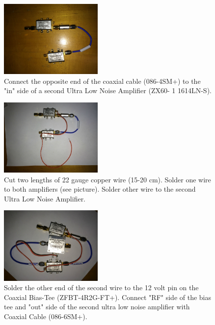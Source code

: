 \documentclass[11pt]{article} %
\begin{document}
\begin{figure}
  \centering
  \caption{Connect the opposite end of the coaxial cable (086-4SM+) to the "in" side of a second Ultra Low Noise Amplifier (ZX60- 1 1614LN-S).  }
  \includegraphics[width=0.45\textwidth]{lna/03.jpeg}
\end{figure}


\begin{figure}
  \centering
  \caption{Cut two lengths of 22 gauge copper wire (15-20 cm).  Solder one wire to both amplifiers (see picture). Solder  other wire to the second Ultra Low Noise Amplifier. }
  \includegraphics[width=0.45\textwidth]{lna/04.jpeg}
\end{figure}


\begin{figure}
  \centering
  \caption{Solder the other end of the second wire to the 12 volt pin on the Coaxial Bias-Tee (ZFBT-4R2G-FT+). Connect "RF" side of the bias tee and "out" side of the second ultra low noise amplifier with Coaxial Cable (086-6SM+). }
  \includegraphics[width=0.45\textwidth]{lna/05.jpeg}
\end{figure}
\end{document}
